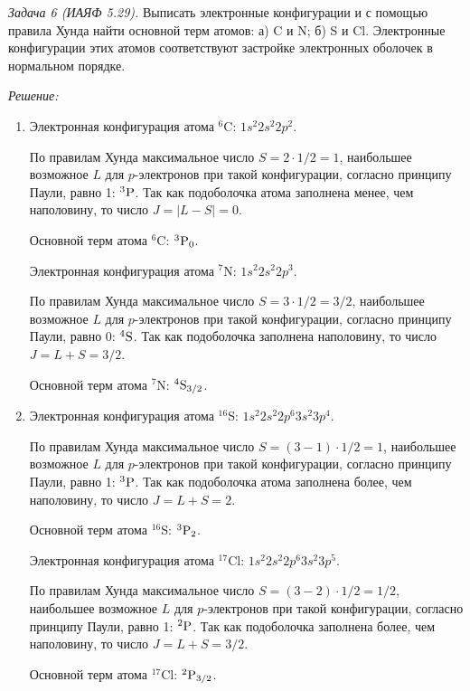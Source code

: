 \emph{Задача 6 (ИАЯФ 5.29).}
Выписать электронные конфигурации и с помощью правила Хунда найти основной
терм атомов: а) C и N; б) S и Cl. Электронные конфигурации этих атомов
соответствуют застройке электронных оболочек в нормальном порядке.

\vspace*{2em}
\emph{Решение:}
\begin{enumerate}
\item Электронная конфигурация атома \( ^6\)C: \( 1s^2 2s^2 2p^2 \).
    
    По правилам Хунда максимальное число \( S = 2 \cdot 1/2 = 1 \), наибольшее
    возможное \( L \) для \( p \)-электронов при такой конфигурации, согласно
    принципу Паули, равно 1: \( ^3\mathrm{P} \).   
    Так как подоболочка атома заполнена менее, чем наполовину, то число
    \( J = |L - S| = 0 \).
    
    Основной терм атома \( ^6 \)C: \( ^3\mathrm{P}_0 \).
    
    Электронная конфигурация атома \( ^7\)N: \( 1s^2 2s^2 2p^3 \).

    По правилам Хунда максимальное число \( S = 3 \cdot 1/2 = 3/2 \), наибольшее
    возможное \( L \) для \( p \)-электронов при такой конфигурации, согласно
    принципу Паули, равно 0: \( ^4\mathrm{S} \). Так как подоболочка заполнена
    наполовину, то число \( J = L + S = 3/2 \).
    
    Основной терм атома \( ^7 \)N: \( ^4\mathrm{S}_{3/2} \).
    
    \item Электронная конфигурация атома \( ^{16}\)S: \( 1s^2 2s^2 2p^6 3s^2
    3p^4 \).
    
    По правилам Хунда максимальное число \( S = (3 - 1) \cdot 1/2 = 1 \), наибольшее
    возможное \( L \) для \( p \)-электронов при такой конфигурации, согласно
    принципу Паули, равно 1: \( ^3\mathrm{P} \). Так как подоболочка атома заполнена
    более, чем наполовину, то число \( J = L + S = 2 \).
    
    Основной терм атома \( ^{16} \)S: \( ^3\mathrm{P}_2 \).
    
    Электронная конфигурация атома \( ^{17}\)Cl: \( 1s^2 2s^2 2p^6 3s^2
    3p^5 \).

    По правилам Хунда максимальное число \( S = (3 - 2) \cdot 1/2 = 1/2 \),
    наибольшее возможное \( L \) для \( p \)-электронов при такой конфигурации,
    согласно принципу Паули, равно 1: \( ^2\mathrm{P} \). Так как подоболочка
    заполнена более, чем наполовину, то число \( J = L + S = 3/2 \).
    
    Основной терм атома \( ^{17} \)Cl: \( ^2\mathrm{P}_{3/2} \).
\end{enumerate}

